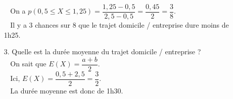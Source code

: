 \begin{itemize}
$\; \; $ On a $p\left(0,5 \leqslant X \leqslant 1,25\right) = \dfrac{1,25-0,5}{2,5-0,5} = \dfrac{0,45}{2} = \dfrac{3}{8}$. \\

$\; \; $ Il y a 3 chances sur 8 que le trajet domicile / entreprise dure moins de 1h25. \\

\item[3.] Quelle est la durée moyenne du trajet domicile / entreprise ? \\

$\; \;$ On sait que $E\left(X\right) = \dfrac{a+b}{2}$. \\

$\; \; $ Ici, $E\left(X\right) = \dfrac{0,5 + 2,5}{2} = \dfrac{3}{2}$. \\

$\; \; $ La durée moyenne est donc de 1h30.

\vspace*{-5cm}

\end{itemize}

\vspace*{-5cm}

\newpage